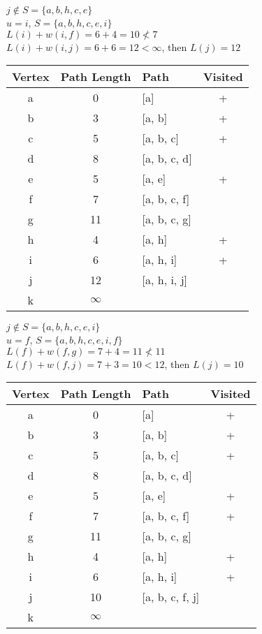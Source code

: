 \documentclass[12pt]{article}
\begin{document}
$j \notin S = \{a, b, h, c, e\}$ \\
$u = i$, $S = \{a, b, h, c, e, i\}$ \\
$L(i) + w(i, f) = 6 + 4 = 10 \not< 7$ \\
$L(i) + w(i, j) = 6 + 6 = 12 < \infty$, then $L(j) = 12$ \\

\begin{center}
\begin{tabular}{c|c|l|c}
    Vertex & Path Length & Path & Visited \\
    \hline
    a & 0 & [a] & + \\
    b & 3 & [a, b] & + \\
    c & 5 & [a, b, c] & + \\
    d & 8 & [a, b, c, d] & \\
    e & 5 & [a, e] & + \\
    f & 7 & [a, b, c, f] & \\
    g & 11 & [a, b, c, g] & \\
    h & 4 & [a, h] & + \\
    i & 6 & [a, h, i] & + \\
    j & 12 & [a, h, i, j] & \\
    k & $\infty$ & &
\end{tabular}
\end{center}

$j \notin S = \{a, b, h, c, e, i\}$ \\
$u = f$, $S = \{a, b, h, c, e, i, f\}$ \\
$L(f) + w(f, g) = 7 + 4 = 11 \not< 11$ \\
$L(f) + w(f, j) = 7 + 3 = 10 < 12$, then $L(j) = 10$ \\

\begin{center}
\begin{tabular}{c|c|l|c}
    Vertex & Path Length & Path & Visited \\
    \hline
    a & 0 & [a] & + \\
    b & 3 & [a, b] & + \\
    c & 5 & [a, b, c] & + \\
    d & 8 & [a, b, c, d] & \\
    e & 5 & [a, e] & + \\
    f & 7 & [a, b, c, f] & + \\
    g & 11 & [a, b, c, g] & \\
    h & 4 & [a, h] & + \\
    i & 6 & [a, h, i] & + \\
    j & 10 & [a, b, c, f, j] & \\
    k & $\infty$ & &
\end{tabular}
\end{center}
\end{document}
